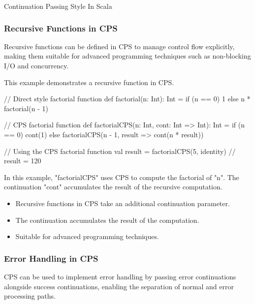 \begin{notes}{Continuation Passing Style In Scala}
\begin{highlight}
    \end{highlight}
    
    \subsubsection*{Recursive Functions in CPS}
    
    Recursive functions can be defined in CPS to manage control flow explicitly, making them suitable for advanced programming techniques such as non-blocking I/O and concurrency.
    
    \begin{highlight}
    
        This example demonstrates a recursive function in CPS.
    
    \begin{code}[Scala]
    // Direct style factorial function
    def factorial(n: Int): Int =
        if (n == 0) 1 else n * factorial(n - 1)
    
    // CPS factorial function
    def factorialCPS(n: Int, cont: Int => Int): Int =
        if (n == 0) cont(1)
        else factorialCPS(n - 1, result => cont(n * result))
    
    // Using the CPS factorial function
    val result = factorialCPS(5, identity)  // result = 120
    \end{code}
    
        In this example, "factorialCPS" uses CPS to compute the factorial of "n". The continuation "cont" accumulates the result of the recursive computation.
    
        \begin{itemize}
            \item Recursive functions in CPS take an additional continuation parameter.
            \item The continuation accumulates the result of the computation.
            \item Suitable for advanced programming techniques.
        \end{itemize}
    
    \end{highlight}
    
    \subsubsection*{Error Handling in CPS}
    
    CPS can be used to implement error handling by passing error continuations alongside success continuations, enabling the separation of normal and error processing paths.
    

\end{notes}
